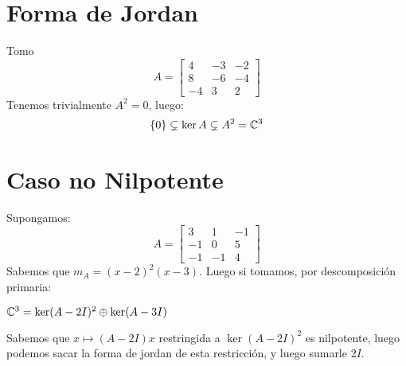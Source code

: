 \documentclass{article}
\begin{document}
\section*{Forma de Jordan}
Tomo
\[
	A =
	\begin{bmatrix}
		4 & -3 & -2 \\
		8 & -6 & -4 \\
		-4 & 3 & 2
	\end{bmatrix}
\]
Tenemos trivialmente $A^2 = 0$, luego:
\[
	\{0\} \subsetneq \ker A \subsetneq A^2 = \mathbb{C}^3
\]
\section*{Caso no Nilpotente}
Supongamos:
\[
	A =
	\begin{bmatrix}
		3 & 1 & -1 \\
		-1 & 0 & 5 \\
		-1 & -1 & 4
	\end{bmatrix}
\]
Sabemos que $m_A = (x-2)^2(x-3)$. Luego si tomamos, por descomposición primaria:

$\mathbb{C}^3 = \ker (A - 2I)^2 \oplus \ker (A-3I)$

Sabemos que $x \mapsto (A - 2I)x$ restringida a $\ker (A - 2I)^2$ es nilpotente, luego podemos sacar la forma de jordan de esta restricción, y luego sumarle $2I$.
\end{document}
